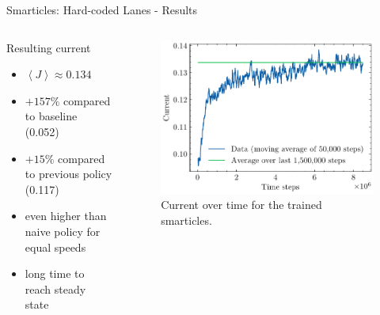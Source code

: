 \documentclass[10pt,xcolor=table, aspectratio=1610]{beamer}
\begin{document}
\begin{frame}{Smarticles: Hard-coded Lanes - Results}
  \begin{columns}
    \begin{block}{Resulting current}
      \begin{itemize}
        \item $\left\langle J \right\rangle \approx 0.134$
        \item $+157\%$ compared to baseline (0.052)
        \item $+15\%$ compared to previous policy (0.117)
        \item even higher than naive policy for equal speeds
        \item long time to reach steady state
      \end{itemize}
    \end{block}
    \begin{figure}
        \includegraphics[width=\textwidth]{../Thesis/img/results/speed_grad_current.pdf}
        \caption*{Current over time for the trained smarticles.}
      \end{figure}
  \end{columns}
\end{frame}
\end{document}
